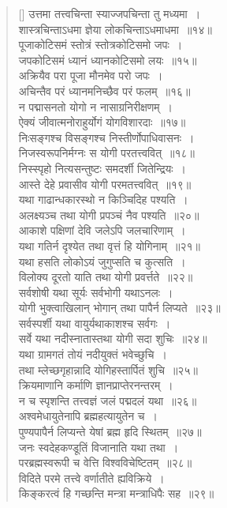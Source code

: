 \documentclass[twoside,12pt,notitlepage]{book}
\begin{document}
\begin{verse}[\versewidth]
उत्तमा तत्त्वचिन्ता स्याज्जपचिन्ता तु मध्यमा~।\\[-6pt]
शास्त्रचिन्ताऽधमा ज्ञेया लोकचिन्ताऽधमाधमा~॥१४॥\\
पूजाकोटिसमं स्तोत्रं स्तोत्रकोटिसमो जपः~।\\[-6pt]
जपकोटिसमं ध्यानं ध्यानकोटिसमो लयः~॥१५॥\\
अक्रियैव परा पूजा मौनमेव परो जपः~।\\[-6pt]
अचिन्तैव परं ध्यानमनिच्छैव परं फलम्~॥१६॥\\
न पद्मासनतो योगो न नासाग्रनिरीक्षणम्~।\\[-6pt]
ऐक्यं जीवात्मनोराहुर्योगं योगविशारदाः~॥१७॥\\
निःसङ्गश्च विसङ्गश्च निस्तीर्णोपाधिवासनः~।\\[-6pt]
निजस्वरूपनिर्मग्नः स योगी परतत्त्ववित्~॥१८॥\\
निस्स्पृहो नित्यसन्तुष्टः समदर्शी जितेन्द्रियः~।\\[-6pt]
आस्ते देहे प्रवासीव योगी परमतत्त्ववित्~॥१९॥\\
यथा गाढान्धकारस्थो न किञ्चिदिह पश्यति~।\\[-6pt]
अलक्ष्यञ्च तथा योगी प्रपञ्चं नैव पश्यति~॥२०॥\\
आकाशे पक्षिणां देवि जलेऽपि जलचारिणाम्~।\\[-6pt]
यथा गतिर्न दृश्येत तथा वृत्तं हि योगिनाम्~॥२१॥\\
यथा हसति लोकोऽयं जुगुप्सति च कुत्सति~।\\[-6pt]
विलोक्य दूरतो याति तथा योगी प्रवर्त्तते~॥२२॥\\
सर्वशोषी यथा सूर्यः सर्वभोगी यथाऽनलः~।\\[-6pt]
योगी भुक्त्वाखिलान् भोगान् तथा पापैर्न लिप्यते~॥२३॥\\
सर्वस्पर्शी यथा वायुर्यथाकाशश्च सर्वगः~।\\[-6pt]
सर्वे यथा नदीस्नातास्तथा योगी सदा शुचिः~॥२४॥\\
यथा ग्रामगतं  तोयं नदीयुक्तं भवेच्छुचि~।\\[-6pt]
तथा म्लेच्छगृहान्नादि योगिहस्तार्पितं शुचि~॥२५॥\\
क्रियमाणानि कर्माणि ज्ञानप्राप्तेरनन्तरम्~।\\[-6pt]
न च स्पृशन्ति तत्त्वज्ञं जलं पद्मदलं यथा~॥२६॥\\
अश्वमेधायुतेनापि ब्रह्महत्यायुतेन च~।\\[-6pt]
पुण्यपापैर्न लिप्यन्ते येषां ब्रह्म हृदि स्थितम्~॥२७॥\\
जनः स्वदेहकण्डूतिं विजानाति यथा तथा~।\\[-6pt]
परब्रह्मस्वरूपी च वेत्ति विश्वविचेष्टितम्~॥२८॥\\
विदिते परमे तत्त्वे वर्णातीते ह्यविक्रिये~।\\[-6pt]
किङ्करत्वं हि गच्छन्ति मन्त्रा मन्त्राधिपैः सह~॥२९॥
\end{verse}
\end{document}
